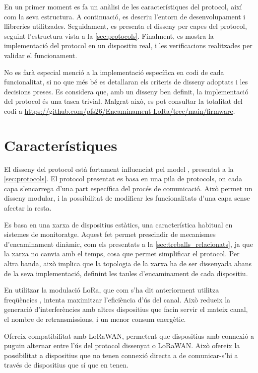 \documentclass{tfgitic}[2024/07/01]
\begin{document}
En un primer moment es fa un anàlisi de les característiques del protocol, així com la seva estructura. A continuació, es descriu l'entorn de desenvolupament i llibreries utilitzades. Seguidament, es presenta el disseny per capes del protocol, seguint l'estructura vista a la \autoref{sec:protocols}. Finalment, es mostra la implementació del protocol en un dispositiu real, i les verificacions realitzades per validar el funcionament.

No es farà especial menció a la implementació específica en codi de cada funcionalitat, si no que més bé es detallaran els criteris de disseny adoptats i les decisions preses. Es considera que, amb un disseny ben definit, la implementació del protocol és una tasca trivial. Malgrat això, es pot consultar la totalitat del codi a \url{https://github.com/pfs26/Encaminament-LoRa/tree/main/firmware}.

\section{Característiques}
El disseny del protocol està fortament influenciat pel model , presentat a la \autoref{sec:protocols}. El protocol presentat es basa en una pila de protocols, on cada capa s'encarrega d'una part específica del procés de comunicació. Això permet un disseny modular, i la possibilitat de modificar les funcionalitats d'una capa sense afectar la resta.

Es basa en una xarxa de dispositius estàtics, una característica habitual en sistemes de monitoratge. Aquest fet permet prescindir de mecanismes d'encaminament dinàmic, com els presentats a la \autoref{sec:treballs_relacionats}, ja que la xarxa no canvia amb el temps, cosa que permet simplificar el protocol. Per altra banda, això implica que la topologia de la xarxa ha de ser dissenyada abans de la seva implementació, definint les taules d'encaminament de cada dispositiu.

En utilitzar la modulació LoRa, que com s'ha dit anteriorment utilitza freqüències , intenta maximitzar l'eficiència d'ús del canal. Això redueix la generació d'interferències amb altres dispositius que facin servir el mateix canal, el nombre de retransmissions, i un menor consum energètic.

Ofereix compatibilitat amb LoRaWAN, permetent que dispositius amb connexió a  puguin alternar entre l'ús del protocol dissenyat o LoRaWAN. Això ofereix la possibilitat a dispositius que no tenen connexió directa a  de comunicar-s'hi a través de dispositius que sí que en tenen.
\end{document}
